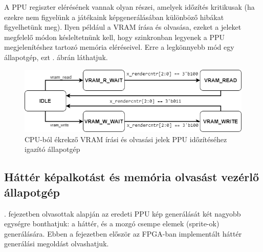 	A PPU regiszter elérésének vannak olyan részei, amelyek időzítés kritikusak (ha ezekre nem figyelünk a játékaink képgenerálásában különböző hibákat figyelhetünk meg). Ilyen például a VRAM írása és olvasása, ezeket a jeleket megfelelő módon késleltetnünk kell, hogy szinkronban legyenek a PPU megjelenítéshez tartozó memória eléréseivel. Erre a legkönnyebb mód egy állapotgép, ezt . ábrán láthatjuk.
	
	\begin{figure}[H]
		\centering
		\includegraphics[width=115mm, keepaspectratio]{figures/VRAM-read-write-FSM}
		\caption{CPU-ból ékrekző VRAM írási és olvasási jelek PPU időzítéséhez igazító állapotgép} 
		\label{fig:VRAM-read-write-FSM}
	\end{figure} 	
	
	\subsection{Háttér képalkotást és memória olvasást vezérlő állapotgép}
	
	. fejezetben olvasottak alapján az eredeti PPU kép generálását két nagyobb egységre bonthatjuk: a háttér, és a mozgó csempe elemek (sprite-ok) %
 generálására. Ebben a fejezetben először az FPGA-ban implementált háttér generálási megoldást olvashatjuk.
	
